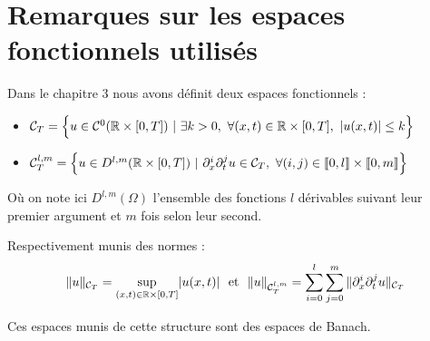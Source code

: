 \appendix
\chapter{Remarques sur les espaces fonctionnels utilisés}

Dans le chapitre 3 nous avons définit deux espaces fonctionnels :

\begin{itemize}
    \item $\mathcal{C}_T = \Big\{ u \in \mathcal{C}^0(\mathbb{R} \times [0,T]) \ | \ \exists k > 0, \ \forall (x,t) \in \mathbb{R} \times [0,T], \ |u(x,t)| \leq k \Big\}$
    \item $\mathcal{C}^{l,m}_T =  \Big\{ u \in D^{l,m}(\mathbb{R} \times [0,T]) \ | \ \partial_x^i \partial_t^j u \in \mathcal{C}_T, \ \forall (i,j) \in \llbracket 0,l \rrbracket \times \llbracket 0,m \rrbracket \Big\}$
\end{itemize}
Où on note ici $D^{l,m}(\Omega)$ l'ensemble des fonctions $l$ dérivables suivant leur premier argument et $m$ fois selon leur second.
\vspace{1em}

Respectivement munis des normes :
$$\|u\|_{\mathcal{C}_T} = \underset{(x,t)\in \mathbb{R} \times [0,T]}{\sup}|u(x,t)| \ \text{ et } \ \| u \|_{\mathcal{C}^{l,m}_T} = \sum_{i=0}^{l} \sum_{j=0}^{m} \| \partial_x^i \partial_t^j u \|_{\mathcal{C}_T} $$

Ces espaces munis de cette structure sont des espaces de Banach. 

